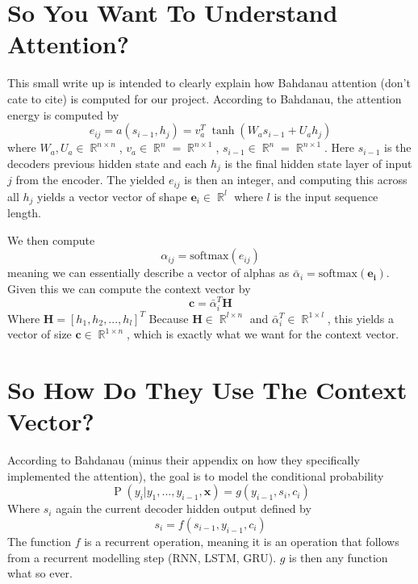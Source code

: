 \documentclass[12pt,a4paper]{article}
\DeclareMathOperator{\prob}{P}
\DeclareMathOperator{\RR}{\mathbb{R}}
\begin{document}
\newpage

\section{So You Want To Understand Attention?}

This small write up is intended to clearly explain how Bahdanau attention (don't cate to cite) is computed for our project. According to Bahdanau, the attention energy is computed by
$$
e_{ij}=a(s_{i-1},h_j)=v_a^T\;\tanh{(W_as_{i-1}+U_ah_j)}
$$
where $W_a,U_a\in{\RR^{n\times n}}$, $v_a\in\RR^{n}=\RR^{n\times 1}$, $s_{i-1}\in\RR^{n}=\RR^{n\times 1}$. Here $s_{i-1}$ is the decoders previous hidden state and each $h_j$ is the final hidden state layer of input $j$ from the encoder. The yielded $e_{ij}$ is then an integer, and computing this across all $h_j$ yields a vector vector of shape $\mathbf{e}_i\in\RR^l$ where $l$ is the input sequence length.

We then compute 
$$\alpha_{ij}=\text{softmax}(e_{ij})$$
meaning we can essentially describe a vector of alphas as $\bar{\alpha}_i=\text{softmax}(\mathbf{e_i})$. Given this we can compute the context vector by
$$
\textbf{c}=\bar{\alpha}_i^T\mathbf{H}
$$
Where $\mathbf{H}=[h_1,h_2,...,h_l]^T$
Because $\mathbf{H}\in\RR^{l\times n}$ and $\bar{\alpha}_i^T\in\RR^{1\times l}$, this yields a vector of size $\mathbf{c}\in\RR^{1\times n}$, which is exactly what we want for the context vector.

\section{So How Do They Use The Context Vector?}

According to Bahdanau (minus their appendix on how they specifically implemented the attention), the goal is to model the conditional probability
$$
\prob{(y_i\vert y_1,...,y_{i-1},\mathbf{x})}=g(y_{i-1},s_i,c_i)
$$
Where $s_i$ again the current decoder hidden output defined by
$$
s_i=f(s_{i-1},y_{i-1},c_i)
$$
The function $f$ is a recurrent operation, meaning it is an operation that follows from a recurrent modelling step (RNN, LSTM, GRU). $g$ is then any function what so ever.
\end{document}
